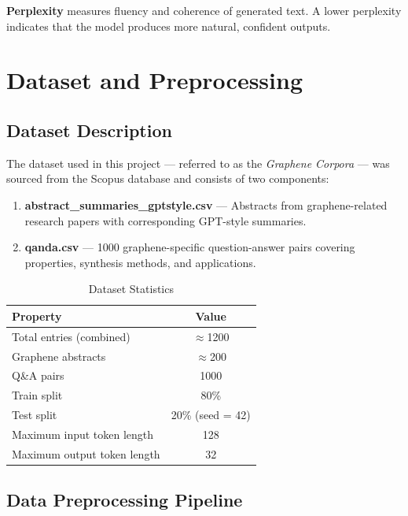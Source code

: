 \documentclass[12pt, a4paper]{report}
\begin{document}
\textbf{Perplexity} measures fluency and coherence of generated text. A lower perplexity indicates that the model produces more natural, confident outputs.

\chapter{Dataset and Preprocessing}

\section{Dataset Description}

The dataset used in this project --- referred to as the \textit{Graphene Corpora} --- was sourced from the Scopus database and consists of two components:

\begin{enumerate}[leftmargin=*]
    \item \textbf{abstract\_summaries\_gptstyle.csv} --- Abstracts from graphene-related research papers with corresponding GPT-style summaries.
    \item \textbf{qanda.csv} --- 1000 graphene-specific question-answer pairs covering properties, synthesis methods, and applications.
\end{enumerate}

\begin{table}[H]
\centering
\caption{Dataset Statistics}
\begin{tabular}{lc}
\toprule
\textbf{Property} & \textbf{Value} \\
\midrule
Total entries (combined) & $\approx$1200 \\
Graphene abstracts & $\approx$200 \\
Q\&A pairs & 1000 \\
Train split & 80\% \\
Test split & 20\% (seed = 42) \\
Maximum input token length & 128 \\
Maximum output token length & 32 \\
\bottomrule
\end{tabular}
\end{table}

\section{Data Preprocessing Pipeline}
\end{document}
